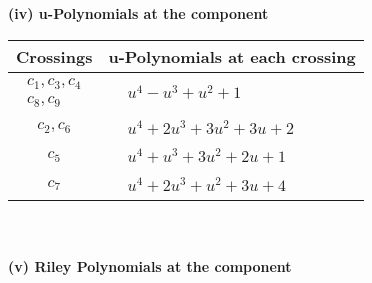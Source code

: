 \documentclass[1p]{elsarticle_modified}
\theoremstyle{definition}
\begin{document}
\newpage\renewcommand{\arraystretch}{1}
\flushleft \textbf{(iv) u-Polynomials at the component}\newline \\
\begin{tabular}{m{50pt}|m{274pt}}
Crossings & \hspace{64pt}u-Polynomials at each crossing \\
\hline $$\begin{aligned}c_{1},c_{3},c_{4}\\c_{8},c_{9}\end{aligned}$$&$\begin{aligned}
&u^4- u^3+u^2+1
\end{aligned}$\\
\hline $$\begin{aligned}c_{2},c_{6}\end{aligned}$$&$\begin{aligned}
&u^4+2 u^3+3 u^2+3 u+2
\end{aligned}$\\
\hline $$\begin{aligned}c_{5}\end{aligned}$$&$\begin{aligned}
&u^4+u^3+3 u^2+2 u+1
\end{aligned}$\\
\hline $$\begin{aligned}c_{7}\end{aligned}$$&$\begin{aligned}
&u^4+2 u^3+u^2+3 u+4
\end{aligned}$\\
\hline
\end{tabular}\\~\\
\newpage\renewcommand{\arraystretch}{1}
\flushleft \textbf{(v) Riley Polynomials at the component}\newline \\
\end{document}
